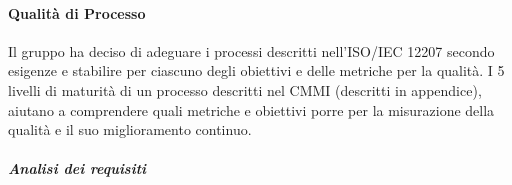 \paragraph{Qualità di Processo}
Il gruppo ha deciso di adeguare i processi descritti nell'ISO/IEC 12207 secondo esigenze e stabilire per ciascuno degli obiettivi e delle metriche per la qualità. I 5 livelli di maturità di un processo descritti nel CMMI (descritti in appendice), aiutano a comprendere quali metriche e obiettivi porre per la misurazione della qualità e il suo miglioramento continuo.
\subparagraph*{Analisi dei requisiti}
